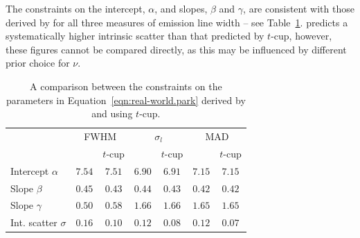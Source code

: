 \documentclass[fleqn,usenatbib]{rasti}
\begin{document}
The constraints on the intercept, $\alpha$, and slopes, $\beta$ and $\gamma$,
are consistent with those derived by \citet{Park:2017} for all three measures of
emission line width -- see Table~\ref{tab:real-world.park.params}.
\citet{Park:2017} predicts a systematically higher intrinsic scatter than that
predicted by $t$-cup, however, these figures cannot be compared directly, as
this may be influenced by different prior choice for $\nu$.

\begin{table}
	\centering
	\caption{A comparison between the constraints on the parameters in
	Equation~\ref{eqn:real-world.park} derived by \citet{Park:2017} and using
	$t$-cup.}
	\label{tab:real-world.park.params}
	\begin{tabular}{lcc|cc|cc} %
                          & \multicolumn{2}{c}{FWHM} & \multicolumn{2}{c}{$\sigma_l$} & \multicolumn{2}{c}{MAD} \\
                          & \citet{Park:2017} & $t$-cup & \citet{Park:2017} & $t$-cup & \citet{Park:2017} & $t$-cup \\
    Intercept $\alpha$    & $7.54$\raisebox{0.5ex}{\tiny$^{+0.26}_{-0.27}$} & $7.51$\raisebox{0.5ex}{\tiny$^{+0.22}_{-0.22}$} & $6.90$\raisebox{0.5ex}{\tiny$^{+0.35}_{-0.34}$} & $6.91$\raisebox{0.5ex}{\tiny$^{+0.30}_{-0.31}$} & $7.15$\raisebox{0.5ex}{\tiny$^{+0.24}_{-0.25}$} & $7.15$\raisebox{0.5ex}{\tiny$^{+0.22}_{-0.22}$} \\
    Slope $\beta$         & $0.45$\raisebox{0.5ex}{\tiny$^{+0.08}_{-0.08}$} & $0.43$\raisebox{0.5ex}{\tiny$^{+0.06}_{-0.06}$} & $0.44$\raisebox{0.5ex}{\tiny$^{+0.07}_{-0.07}$} & $0.43$\raisebox{0.5ex}{\tiny$^{+0.05}_{-0.06}$} & $0.42$\raisebox{0.5ex}{\tiny$^{+0.07}_{-0.07}$} & $0.42$\raisebox{0.5ex}{\tiny$^{+0.05}_{-0.06}$} \\
    Slope $\gamma$        & $0.50$\raisebox{0.5ex}{\tiny$^{+0.55}_{-0.53}$} & $0.58$\raisebox{0.5ex}{\tiny$^{+0.44}_{-0.45}$} & $1.66$\raisebox{0.5ex}{\tiny$^{+0.65}_{-0.66}$} & $1.66$\raisebox{0.5ex}{\tiny$^{+0.57}_{-0.58}$} & $1.65$\raisebox{0.5ex}{\tiny$^{+0.61}_{-0.62}$} & $1.65$\raisebox{0.5ex}{\tiny$^{+0.55}_{-0.55}$} \\
    Int. scatter $\sigma$ & $0.16$\raisebox{0.5ex}{\tiny$^{+0.10}_{-0.08}$} & $0.10$\raisebox{0.5ex}{\tiny$^{+0.03}_{-0.10}$} & $0.12$\raisebox{0.5ex}{\tiny$^{+0.09}_{-0.06}$} & $0.08$\raisebox{0.5ex}{\tiny$^{+0.02}_{-0.08}$} & $0.12$\raisebox{0.5ex}{\tiny$^{+0.09}_{-0.06}$} & $0.07$\raisebox{0.5ex}{\tiny$^{+0.02}_{-0.07}$} \\
    \end{tabular}
\end{table}
\end{document}
